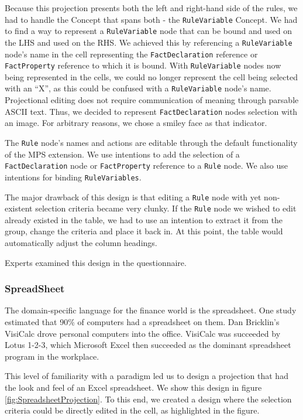 Because this projection presents both the left and right-hand side of the rules, we had to handle the Concept that spans both - the \texttt{RuleVariable} Concept.
We had to find a way to represent a \texttt{RuleVariable} node that can be bound and used on the LHS and used on the RHS.
We achieved this by referencing a \texttt{RuleVariable} node's name in the cell representing the \texttt{FactDeclaration} reference or \texttt{FactProperty} reference to which it is bound.
With \texttt{RuleVariable} nodes now being represented in the cells, we could no longer represent the cell being selected with an ``X'', as this could be confused with a \texttt{RuleVariable} node's name.
Projectional editing does not require communication of meaning through parsable ASCII text.
Thus, we decided to represent \texttt{FactDeclaration} nodes selection with an image.
For arbitrary reasons, we chose a smiley face as that indicator.

The \texttt{Rule} node's names and actions are editable through the default functionality of the MPS extension.
We use intentions to add the selection of a \texttt{FactDeclaration} node or \texttt{FactProperty} reference to a \texttt{Rule} node.
We also use intentions for binding \texttt{RuleVariables}.

The major drawback of this design is that editing a \texttt{Rule} node with yet non-existent selection criteria became very clunky.
If the \texttt{Rule} node we wished to edit already existed in the table, we had to use an intention to extract it from the group, change the criteria and place it back in.
At this point, the table would automatically adjust the column headings.

Experts examined this design in the questionnaire.

\subsubsection{SpreadSheet}

The domain-specific language for the finance world is the spreadsheet.
One study estimated that 90\% of computers had a spreadsheet on them\cite{bradley2009using}.
Dan Bricklin's VisiCalc drove personal computers into the office.
VisiCalc was succeeded by Lotus 1-2-3, which Microsoft Excel then succeeded as the dominant spreadsheet program in the workplace.

This level of familiarity with a paradigm led us to design a projection that had the look and feel of an Excel spreadsheet.
We show this design in figure \ref{fig:SpreadsheetProjection}.
To this end, we created a design where the selection criteria could be directly edited in the cell, as highlighted in the figure.

